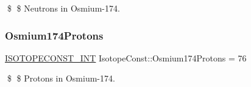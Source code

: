 \$ \$ Neutrons in Osmium-\/174. \mbox{\label{group___isotope_const-_osmium-_os174_ga2a9bae00a4a6d5ff6e66cbb8bfca66eb}} 
\subsubsection{\texorpdfstring{Osmium174\+Protons}{Osmium174Protons}}
{\footnotesize\ttfamily \mbox{\hyperlink{group___isotope_const-_macros_ga5f18360b3e99483a35c32d789e62621c}{I\+S\+O\+T\+O\+P\+E\+C\+O\+N\+S\+T\+\_\+\+I\+NT}} Isotope\+Const\+::\+Osmium174\+Protons = 76}

\$ \$ Protons in Osmium-\/174. 